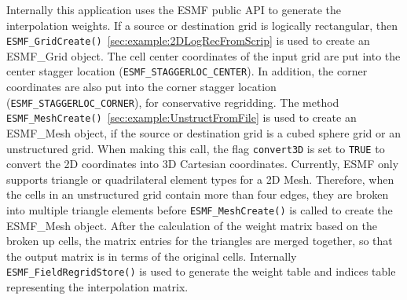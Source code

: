 Internally this application uses the ESMF public API to generate the interpolation weights.
If a source or destination grid is logically rectangular, then {\tt ESMF\_GridCreate()}~\ref{sec:example:2DLogRecFromScrip} is used to create an ESMF\_Grid object. The cell center 
coordinates of the input grid are put into the center stagger location ({\tt ESMF\_STAGGERLOC\_CENTER}). 
In addition, the corner coordinates are also put into the corner stagger location 
({\tt ESMF\_STAGGERLOC\_CORNER}), for conservative regridding.  The method
{\tt ESMF\_MeshCreate()}~\ref{sec:example:UnstructFromFile} is used to create an ESMF\_Mesh object, if the 
source or destination grid is a cubed sphere grid or an unstructured grid. When making this call, 
the flag {\tt convert3D} is set to {\tt TRUE} to convert the 2D coordinates into 3D Cartesian coordinates. Currently, ESMF only supports
triangle or quadrilateral element types for a 2D Mesh.  Therefore, when the cells in an unstructured grid contain more than four edges, they are broken into multiple triangle elements before {\tt ESMF\_MeshCreate()} is called to create the ESMF\_Mesh object. After the calculation of the weight matrix based on the broken up
cells, the matrix entries for the triangles are merged together, so that the output matrix is in terms of the original cells.  
Internally {\tt ESMF\_FieldRegridStore()} is used to generate the weight table and indices table representing the interpolation matrix. 

